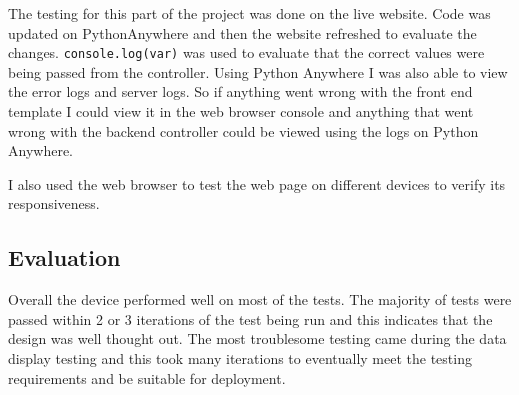 \documentclass[10pt,a4paper]{article}
\begin{document}
The testing for this part of the project was done on the live website. Code was updated on PythonAnywhere and then the website refreshed to evaluate the changes. \texttt{console.log(var)} was used to evaluate that the correct values were being passed from the controller. Using Python Anywhere I was also able to view the error logs and server logs. So if anything went wrong with the front end template I could view it in the web browser console and anything that went wrong with the backend controller could be viewed using the logs on Python Anywhere. 

I also used the web browser to test the web page on different devices to verify its responsiveness. 

\subsection{Evaluation}
Overall the device performed well on most of the tests. The majority of tests were passed within 2 or 3 iterations of the test being run and this indicates that the design was well thought out. The most troublesome testing came during the data display testing and this took many iterations to eventually meet the testing requirements and be suitable for deployment. 
\end{document}
